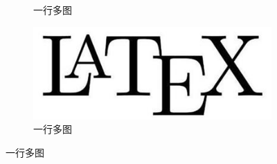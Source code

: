 \begin{figure}[htbp]
\begin{subfigure}[t]{0.2\linewidth}
        \caption{一行多图}
        \label{fig:myfig4}
    \end{subfigure}
    \quad
    \begin{subfigure}[t]{0.2\linewidth}
        \includegraphics[width=\linewidth]{figure/Latex.jpg}
        \caption{一行多图}
        \label{fig:myfig5}
    \end{subfigure}
    \caption{一行多图}
    \label{fig:myfig6}
\end{figure}

